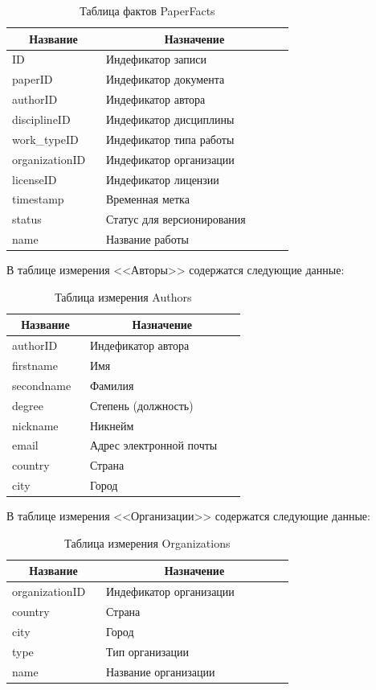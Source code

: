 \documentclass[a4paper,14pt]{extarticle}
\newcommand{\heading}[1]{\multicolumn{1}{|c|}{\textbf{#1}}}
\begin{document}
\begin{table}[h!]
	\caption{Таблица фактов PaperFacts}
	\begin{tabular}{|p{0.3\linewidth}|p{0.6\linewidth}|}
		\hline
		\heading{Название} & \heading{Назначение} \\ \hline
		ID & Индефикатор записи \\ \hline
		paperID & Индефикатор документа \\ \hline
		authorID & Индефикатор автора \\ \hline
		disciplineID & Индефикатор дисциплины  \\ \hline
		work\_typeID & Индефикатор типа работы \\ \hline
		organizationID & Индефикатор организации \\ \hline
		licenseID & Индефикатор лицензии \\ \hline
		timestamp & Временная метка \\ \hline
		status & Статус для версионирования \\ \hline
		name & Название работы \\ \hline
	\end{tabular}
	\label{tab:facts}
\end{table}

В таблице измерения <<Авторы>> содержатся следующие данные:

\begin{table}[h!]
	\caption{Таблица измерения Authors}
	\begin{tabular}{|p{0.3\linewidth}|p{0.6\linewidth}|}
		\hline
		\heading{Название} & \heading{Назначение} \\ \hline
		authorID & Индефикатор автора \\ \hline
		firstname & Имя \\ \hline
		secondname & Фамилия \\ \hline
		degree & Степень (должность) \\ \hline
		nickname & Никнейм \\ \hline
		email & Адрес электронной почты \\ \hline
		country & Страна \\ \hline
		city & Город \\ \hline
	\end{tabular}
	\label{tab:authors}
\end{table}

В таблице измерения <<Организации>> содержатся следующие данные:
\begin{table}[h!]
	\caption{Таблица измерения Organizations}
	\begin{tabular}{|p{0.3\linewidth}|p{0.6\linewidth}|}
		\hline
		\heading{Название} & \heading{Назначение} \\ \hline
		organizationID & Индефикатор организации \\ \hline
		country & Страна \\ \hline
		city & Город \\ \hline
		type & Тип организации \\ \hline
		name & Название организации \\ \hline
	\end{tabular}
	\label{tab:orgs}
\end{table}
\end{document}
